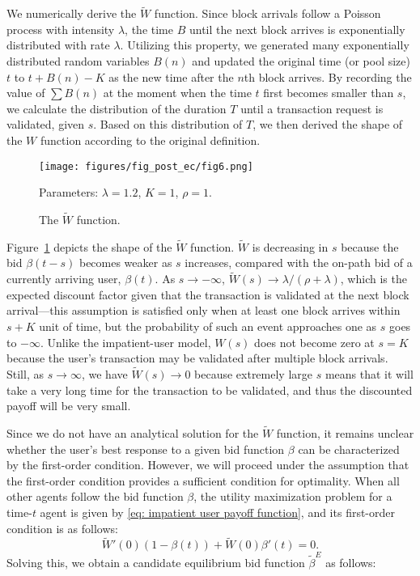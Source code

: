 \documentclass[12pt, letterpaper]{article}
\begin{document}
We numerically derive the $\tilde{W}$ function. Since block arrivals follow a Poisson process with intensity $\lambda$, the time $B$ until the next block arrives is exponentially distributed with rate $\lambda$. Utilizing this property, we generated many exponentially distributed random variables $B(n)$ and updated the original time (or pool size) $t$ to $t + B(n) - K$ as the new time after the $n$th block arrives. By recording the value of $\sum B(n)$ at the moment when the time $t$ first becomes smaller than $s$, we calculate the distribution of the duration $T$ until a transaction request is validated, given $s$. Based on this distribution of $T$, we then derived the shape of the $W$ function according to the original definition.

\begin{figure}
    \centering
    \texttt{[image: figures/fig\_post\_ec/fig6.png]}
    \caption{The $\tilde{W}$ function.}
    \begin{center}\footnotesize
        Parameters: $\lambda = 1.2$, $K = 1$, $\rho = 1$.
    \end{center}
    \label{fig: patient_W}
\end{figure}

Figure~\ref{fig: patient_W} depicts the shape of the $\tilde{W}$ function. $\tilde{W}$ is decreasing in $s$ because the bid $\beta(t - s)$ becomes weaker as $s$ increases, compared with the on-path bid of a currently arriving user, $\beta(t)$. As $s \to -\infty$, $\tilde{W}(s) \to \lambda/(\rho + \lambda)$, which is the expected discount factor given that the transaction is validated at the next block arrival---this assumption is satisfied only when at least one block arrives within $s + K$ unit of time, but the probability of such an event approaches one as $s$ goes to $-\infty$. Unlike the impatient-user model, $W(s)$ does not become zero at $s = K$ because the user's transaction may be validated after multiple block arrivals. Still, as $s \to \infty$, we have $\tilde{W}(s) \to 0$ because extremely large $s$ means that it will take a very long time for the transaction to be validated, and thus the discounted payoff will be very small.

Since we do not have an analytical solution for the $\tilde{W}$ function, it remains unclear whether the user's best response to a given bid function $\beta$ can be characterized by the first-order condition. However, we will proceed under the assumption that the first-order condition provides a sufficient condition for optimality. When all other agents follow the bid function $\beta$, the utility maximization problem for a time-$t$ agent is given by \eqref{eq: impatient user payoff function}, and its first-order condition is as follows:
\begin{equation}\label{eq: W-tilde FOC}
    \tilde{W}'(0) (1 - \beta(t)) + \tilde{W}(0)\beta'(t) = 0.
\end{equation}
Solving this, we obtain a candidate equilibrium bid function $\tilde{\beta}^E$ as follows:
\end{document}
